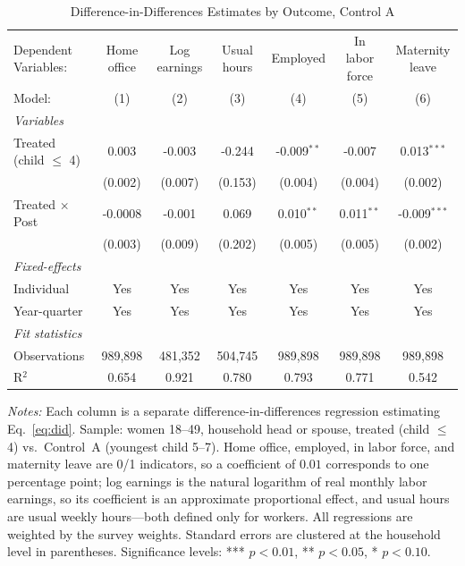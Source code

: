 
\begin{table}[H]
   \caption{\label{tab:did_outcomes_A} Difference-in-Differences Estimates by Outcome, Control A}
   \centering
\footnotesize\setlength{\tabcolsep}{3pt}
   \begin{tabular}{lcccccc}
      \toprule
      Dependent Variables:      & Home office & Log earnings & Usual hours & Employed      & In labor force & Maternity leave\\  
      Model:                    & (1)         & (2)          & (3)         & (4)           & (5)            & (6)\\  
      \midrule
      \emph{Variables}\\
      Treated (child $\leq$ 4)  & 0.003       & -0.003       & -0.244      & -0.009$^{**}$ & -0.007         & 0.013$^{***}$\\   
                                & (0.002)     & (0.007)      & (0.153)     & (0.004)       & (0.004)        & (0.002)\\   
\addlinespace[2pt]
      Treated $\times$ Post     & -0.0008     & -0.001       & 0.069       & 0.010$^{**}$  & 0.011$^{**}$   & -0.009$^{***}$\\   
                                & (0.003)     & (0.009)      & (0.202)     & (0.005)       & (0.005)        & (0.002)\\   
\addlinespace[2pt]
      \midrule
      \emph{Fixed-effects}\\
      Individual                & Yes         & Yes          & Yes         & Yes           & Yes            & Yes\\  
      Year-quarter              & Yes         & Yes          & Yes         & Yes           & Yes            & Yes\\  
      \midrule
      \emph{Fit statistics}\\
      Observations              & 989,898     & 481,352      & 504,745     & 989,898       & 989,898        & 989,898\\  
      R$^2$                     & 0.654       & 0.921        & 0.780       & 0.793         & 0.771          & 0.542\\  
\bottomrule
   \end{tabular}
   
   \par \raggedright 
   \footnotesize\textit{Notes:} Each column is a separate difference-in-differences regression estimating Eq.~\eqref{eq:did}. Sample: women 18--49, household head or spouse, treated (child $\leq$ 4) vs.\ Control~A (youngest child 5--7). Home office, employed, in labor force, and maternity leave are 0/1 indicators, so a coefficient of $0.01$ corresponds to one percentage point; log earnings is the natural logarithm of real monthly labor earnings, so its coefficient is an approximate proportional effect, and usual hours are usual weekly hours---both defined only for workers. All regressions are weighted by the survey weights. Standard errors are clustered at the household level in parentheses. Significance levels: *** $p<0.01$, ** $p<0.05$, * $p<0.10$.
\end{table}


